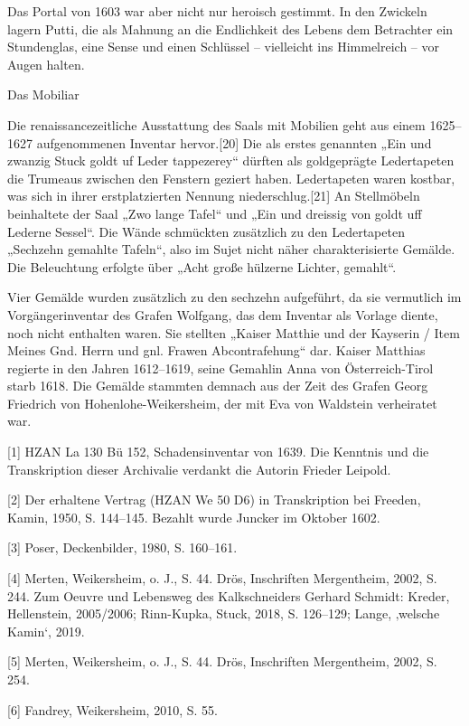 \documentclass[
  letterpaper,
]{book}
\begin{document}
Das Portal von 1603 war aber nicht nur heroisch gestimmt. In den
Zwickeln lagern Putti, die als Mahnung an die Endlichkeit des Lebens dem
Betrachter ein Stundenglas, eine Sense und einen Schlüssel -- vielleicht
ins Himmelreich -- vor Augen halten.

Das Mobiliar

Die renaissancezeitliche Ausstattung des Saals mit Mobilien geht aus
einem 1625--1627 aufgenommenen Inventar hervor.{[}20{]} Die als erstes
genannten „Ein und zwanzig Stuck goldt uf Leder tappezerey`` dürften als
goldgeprägte Ledertapeten die Trumeaus zwischen den Fenstern geziert
haben. Ledertapeten waren kostbar, was sich in ihrer erstplatzierten
Nennung niederschlug.{[}21{]} An Stellmöbeln beinhaltete der Saal „Zwo
lange Tafel`` und „Ein und dreissig von goldt uff Lederne Sessel``. Die
Wände schmückten zusätzlich zu den Ledertapeten „Sechzehn gemahlte
Tafeln``, also im Sujet nicht näher charakterisierte Gemälde. Die
Beleuchtung erfolgte über „Acht große hülzerne Lichter, gemahlt``.

Vier Gemälde wurden zusätzlich zu den sechzehn aufgeführt, da sie
vermutlich im Vorgängerinventar des Grafen Wolfgang, das dem Inventar
als Vorlage diente, noch nicht enthalten waren. Sie stellten „Kaiser
Matthie und der Kayserin / Item Meines Gnd. Herrn und gnl. Frawen
Abcontrafehung`` dar. Kaiser Matthias regierte in den Jahren 1612--1619,
seine Gemahlin Anna von Österreich-Tirol starb 1618. Die Gemälde
stammten demnach aus der Zeit des Grafen Georg Friedrich von
Hohenlohe-Weikersheim, der mit Eva von Waldstein verheiratet war.

{[}1{]} HZAN La 130 Bü 152, Schadensinventar von 1639. Die Kenntnis und
die Transkription dieser Archivalie verdankt die Autorin Frieder
Leipold.

{[}2{]} Der erhaltene Vertrag (HZAN We 50 D6) in Transkription bei
Freeden, Kamin, 1950, S. 144--145. Bezahlt wurde Juncker im Oktober
1602.

{[}3{]} Poser, Deckenbilder, 1980, S. 160--161.

{[}4{]} Merten, Weikersheim, o. J., S. 44. Drös, Inschriften
Mergentheim, 2002, S. 244. Zum Oeuvre und Lebensweg des Kalkschneiders
Gerhard Schmidt: Kreder, Hellenstein, 2005/2006; Rinn-Kupka, Stuck,
2018, S. 126--129; Lange, ‚welsche Kamin`, 2019.

{[}5{]} Merten, Weikersheim, o. J., S. 44. Drös, Inschriften
Mergentheim, 2002, S. 254.

{[}6{]} Fandrey, Weikersheim, 2010, S. 55.
\end{document}
